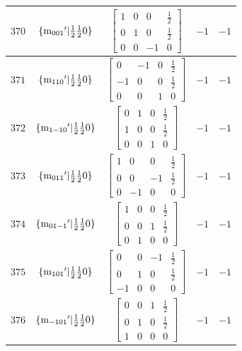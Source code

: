 \documentclass[fleqn,8pt]{jsarticle}
\begin{document}
\begin{longtable}{ccccc}
$ 370 $ & $ \{{\rm m}_{001}{}'|\frac{1}{2} \frac{1}{2} 0\} $ & $ \begin{bmatrix} 1 & 0 & 0 & \frac{1}{2} \\ 0 & 1 & 0 & \frac{1}{2} \\ 0 & 0 & -1 & 0 \end{bmatrix} $ & $ -1 $ & $ -1 $ \\ \hline
$ 371 $ & $ \{{\rm m}_{110}{}'|\frac{1}{2} \frac{1}{2} 0\} $ & $ \begin{bmatrix} 0 & -1 & 0 & \frac{1}{2} \\ -1 & 0 & 0 & \frac{1}{2} \\ 0 & 0 & 1 & 0 \end{bmatrix} $ & $ -1 $ & $ -1 $ \\ \hline
$ 372 $ & $ \{{\rm m}_{1-10}{}'|\frac{1}{2} \frac{1}{2} 0\} $ & $ \begin{bmatrix} 0 & 1 & 0 & \frac{1}{2} \\ 1 & 0 & 0 & \frac{1}{2} \\ 0 & 0 & 1 & 0 \end{bmatrix} $ & $ -1 $ & $ -1 $ \\ \hline
$ 373 $ & $ \{{\rm m}_{011}{}'|\frac{1}{2} \frac{1}{2} 0\} $ & $ \begin{bmatrix} 1 & 0 & 0 & \frac{1}{2} \\ 0 & 0 & -1 & \frac{1}{2} \\ 0 & -1 & 0 & 0 \end{bmatrix} $ & $ -1 $ & $ -1 $ \\ \hline
$ 374 $ & $ \{{\rm m}_{01-1}{}'|\frac{1}{2} \frac{1}{2} 0\} $ & $ \begin{bmatrix} 1 & 0 & 0 & \frac{1}{2} \\ 0 & 0 & 1 & \frac{1}{2} \\ 0 & 1 & 0 & 0 \end{bmatrix} $ & $ -1 $ & $ -1 $ \\ \hline
$ 375 $ & $ \{{\rm m}_{101}{}'|\frac{1}{2} \frac{1}{2} 0\} $ & $ \begin{bmatrix} 0 & 0 & -1 & \frac{1}{2} \\ 0 & 1 & 0 & \frac{1}{2} \\ -1 & 0 & 0 & 0 \end{bmatrix} $ & $ -1 $ & $ -1 $ \\ \hline
$ 376 $ & $ \{{\rm m}_{-101}{}'|\frac{1}{2} \frac{1}{2} 0\} $ & $ \begin{bmatrix} 0 & 0 & 1 & \frac{1}{2} \\ 0 & 1 & 0 & \frac{1}{2} \\ 1 & 0 & 0 & 0 \end{bmatrix} $ & $ -1 $ & $ -1 $ \\ \hline

\end{longtable}
\end{document}
